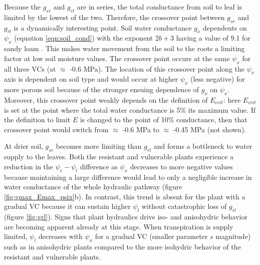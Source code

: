 \documentclass[utf8]{frontiersSCNS} %
\begin{document}
Because the $g_{sr}$ and $g_{rl}$ are in series, the total conductance from soil to leaf is limited by the lowest of the two. Therefore, the crossover point between $g_{sr}$ and $g_{rl}$ is a dynamically interesting point. Soil water conductance $g_x$ dependents on $\psi_x$ (equation \ref{eqn:soil_cond}) with the exponent $2b+3$ having a value of 9.1 for sandy loam \citep{campbell_introduction_2012}. This makes water movement from the soil to the roots a limiting factor at low soil moisture values. The crossover point occurs at the same $\psi_x$ for all three VCs (at $\approx$ -0.6 MPa). The location of this crossover point along the $\psi_x$ axis is dependent on soil type and would occur at higher $\psi_x$ (less negative) for more porous soil because of the stronger ensuing dependence of $g_x$ on $\psi_x$. Moreover, this crossover point weakly depends on the definition of $E_{crit}$: here $E_{crit}$ is set at the point where the total water conductance is 5\% its maximum value. If the definition to limit $E$ is changed to the point of 10\% conductance, then that crossover point would switch from $\approx$ -0.6 MPa to $\approx$ -0.45 MPa (not shown).

At drier soil, $g_{sr}$ becomes more limiting than $g_{rl}$ and forms a bottleneck to water supply to the leaves. Both the resistant and vulnerable plants experience a reduction in the $\psi_r - \psi_l$ difference as $\psi_x$ decreases to more negative values because maintaining a large difference would lead to only a negligible increase in water conductance of the whole hydraulic pathway (figure \ref{fig:gmax_Emax_psix}b). In contrast, this trend is absent for the plant with a gradual VC because it can sustain higher $\psi_l$ without catastrophic loss of $g_{rl}$ (figure \ref{fig:grl}). Signs that plant hydraulics drive iso- and anisohydric behavior are becoming apparent already at this stage. When transpiration is supply limited, $\psi_l$ decreases with $\psi_x$ for a gradual VC (smaller parameter $s$ magnitude) such as in anisohydric plants compared to the more isohydric behavior of the resistant and vulnerable plants.

\end{document}
